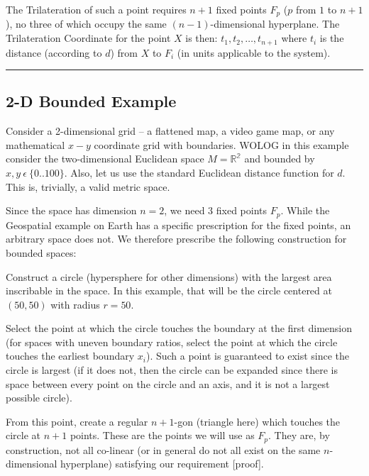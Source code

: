 \documentclass[]{article}
\begin{document}
The Trilateration of such a point requires \(n+1\) fixed points \(F_p\)
(\(p\) from \(1\) to \(n+1\)), no three of which occupy the same
\((n-1)\)-dimensional hyperplane. The Trilateration Coordinate for the
point \(X\) is then: \({t_1, t_2, …, t_{n+1}}\) where \(t_i\) is the
distance (according to \(d\)) from \(X\) to \(F_i\) (in units applicable
to the system).

\begin{center}\rule{0.5\linewidth}{0.5pt}\end{center}

\subsection{2-D Bounded Example}\label{d-bounded-example}

Consider a 2-dimensional grid -- a flattened map, a video game map, or
any mathematical \(x-y\) coordinate grid with boundaries. WOLOG in this
example consider the two-dimensional Euclidean space \(M=\mathbb{R^2}\)
and bounded by \(x,y\ \epsilon\  \{0..100\}\). Also, let us use the
standard Euclidean distance function for \(d\). This is, trivially, a
valid metric space.

Since the space has dimension \(n=2\), we need \(3\) fixed points
\(F_p\). While the Geospatial example on Earth has a specific
prescription for the fixed points, an arbitrary space does not. We
therefore prescribe the following construction for bounded spaces:

Construct a circle (hypersphere for other dimensions) with the largest
area inscribable in the space. In this example, that will be the circle
centered at \((50,50)\) with radius \(r=50\).

Select the point at which the circle touches the boundary at the first
dimension (for spaces with uneven boundary ratios, select the point at
which the circle touches the earliest boundary \(x_i\)). Such a point is
guaranteed to exist since the circle is largest (if it does not, then
the circle can be expanded since there is space between every point on
the circle and an axis, and it is not a largest possible circle).

From this point, create a regular \(n+1\)-gon (triangle here) which
touches the circle at \(n+1\) points. These are the points we will use
as \(F_p\). They are, by construction, not all co-linear (or in general
do not all exist on the same \(n\)-dimensional hyperplane) satisfying
our requirement {[}proof{]}.
\end{document}
